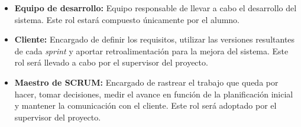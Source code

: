     \begin{itemize}
        \item \textbf{Equipo de desarrollo:} Equipo responsable de llevar a cabo el desarrollo del sistema. Este rol estará compuesto únicamente por el alumno.
        
        \item \textbf{Cliente:} Encargado de definir los requisitos, utilizar las versiones resultantes de cada \textit{sprint} y aportar retroalimentación para la mejora del sistema. Este rol será llevado a cabo por el supervisor del proyecto.
        
        \item \textbf{Maestro de SCRUM:} Encargado de rastrear el trabajo que queda por hacer, tomar decisiones, medir el avance en función de la planificación inicial y mantener la comunicación con el cliente. Este rol será adoptado por el supervisor del proyecto.
    \end{itemize}
    
    

